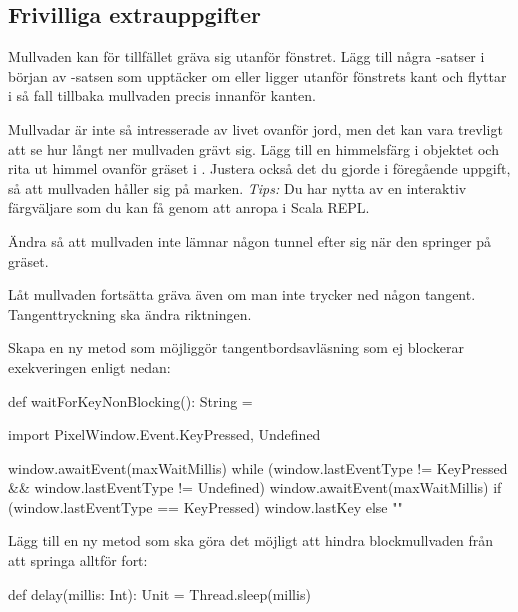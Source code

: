 
\subsection{Frivilliga extrauppgifter}

\Task
Mullvaden kan för tillfället gräva sig utanför fönstret.
Lägg till några -satser i början av -satsen som upptäcker om  eller  ligger utanför fönstrets kant och flyttar i så fall tillbaka mullvaden precis innanför kanten.

\Task
Mullvadar är inte så intresserade av livet ovanför jord, men det kan vara trevligt att se hur långt ner mullvaden grävt sig.
Lägg till en himmelsfärg i objektet  och rita ut himmel ovanför gräset i .
Justera också det du gjorde i föregående uppgift, så att mullvaden håller sig på marken. \emph{Tips:} Du har nytta av en interaktiv färgväljare som du kan få genom att anropa  i Scala REPL.

\Task
Ändra så att mullvaden inte lämnar någon tunnel efter sig när den springer på gräset.

\Task
Låt mullvaden fortsätta gräva även om man inte trycker ned någon tangent. Tangenttryckning ska ändra riktningen.

\Subtask
Skapa en ny metod  som möjliggör tangentbordsavläsning som ej blockerar exekveringen enligt nedan:

\begin{Code}
  def waitForKeyNonBlocking(): String  = {
    import PixelWindow.Event.{KeyPressed, Undefined}

    window.awaitEvent(maxWaitMillis)
    while (window.lastEventType != KeyPressed  &&
           window.lastEventType != Undefined) {
      window.awaitEvent(maxWaitMillis)
    }
    if (window.lastEventType == KeyPressed) window.lastKey else ""
  }
\end{Code}

\Subtask
Lägg till en ny metod  som ska göra det möjligt att hindra blockmullvaden från att springa alltför fort:
\begin{Code}
  def delay(millis: Int): Unit = Thread.sleep(millis)
\end{Code}



